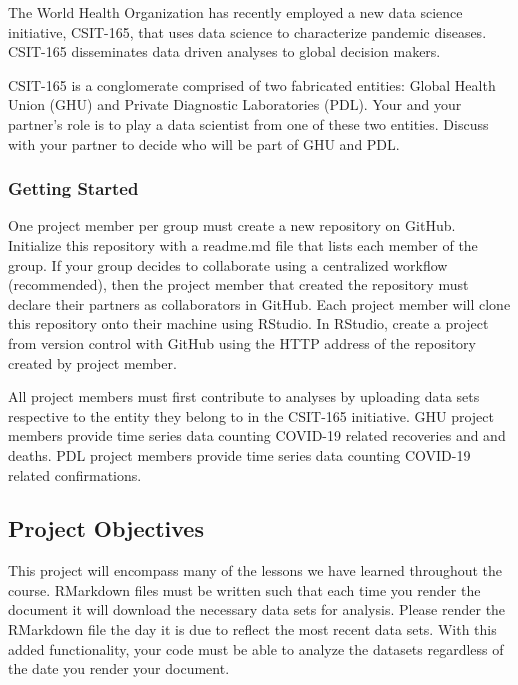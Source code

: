 \documentclass[
]{article}
\begin{document}
The World Health Organization has recently employed a new data science
initiative, CSIT-165, that uses data science to characterize pandemic
diseases. CSIT-165 disseminates data driven analyses to global decision
makers.

CSIT-165 is a conglomerate comprised of two fabricated entities: Global
Health Union (GHU) and Private Diagnostic Laboratories (PDL). Your and
your partner's role is to play a data scientist from one of these two
entities. Discuss with your partner to decide who will be part of GHU
and PDL.

\hypertarget{getting-started}{%
\subsubsection{Getting Started}\label{getting-started}}

One project member per group must create a new repository on GitHub.
Initialize this repository with a readme.md file that lists each member
of the group. If your group decides to collaborate using a centralized
workflow (recommended), then the project member that created the
repository must declare their partners as collaborators in GitHub. Each
project member will clone this repository onto their machine using
RStudio. In RStudio, create a project from version control with GitHub
using the HTTP address of the repository created by project member.

All project members must first contribute to analyses by uploading data
sets respective to the entity they belong to in the CSIT-165 initiative.
GHU project members provide time series data counting COVID-19 related
recoveries and and deaths. PDL project members provide time series data
counting COVID-19 related confirmations.

\hypertarget{project-objectives}{%
\subsection{Project Objectives}\label{project-objectives}}

This project will encompass many of the lessons we have learned
throughout the course. RMarkdown files must be written such that each
time you render the document it will download the necessary data sets
for analysis. Please render the RMarkdown file the day it is due to
reflect the most recent data sets. With this added functionality, your
code must be able to analyze the datasets regardless of the date you
render your document.
\end{document}

